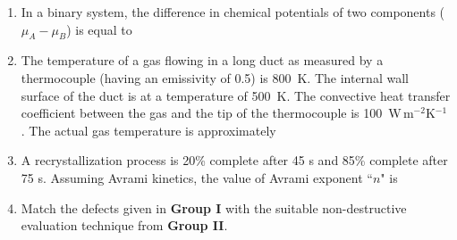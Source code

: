 \documentclass[journal,12pt,onecolumn]{IEEEtran}
\theoremstyle{remark}
\begin{document}
\begin{enumerate}
    \item In a binary system, the difference in chemical potentials of two components ($\mu_A-\mu_B$) is equal to
    \hfill{}
    \begin{enumerate}[label=(\Alph*)]
    \end{enumerate}

    \item The temperature of a gas flowing in a long duct as measured by a thermocouple (having an emissivity of 0.5) is 800~K. The internal wall surface of the duct is at a temperature of 500~K. The convective heat transfer coefficient between the gas and the tip of the thermocouple is 100~W\,m$^{-2}$K$^{-1}$. The actual gas temperature is approximately
    \hfill{}
    \begin{enumerate}[label=(\Alph*)]
    \end{enumerate}

    \item A recrystallization process is 20\% complete after 45 s and 85\% complete after 75 s. Assuming Avrami kinetics, the value of Avrami exponent ``$n$" is
    \hfill{}
    \begin{enumerate}[label=(\Alph*)]
    \end{enumerate}
    
    \item Match the defects given in \textbf{Group I} with the suitable non-destructive evaluation technique from \textbf{Group II}.
    

\end{enumerate}
\end{document}
